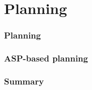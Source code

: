 \newcommand{\PLANNING}{planning} %
\part{Planning}
\section{Planning}



\section{ASP-based planning}

\section{Summary}

%
